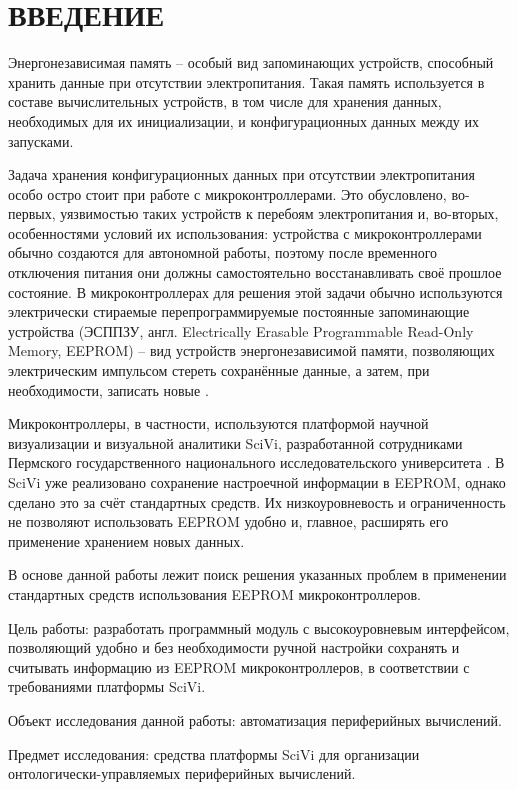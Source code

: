 \chapter*{ВВЕДЕНИЕ}

Энергонезависимая память -- особый вид запоминающих устройств, способный хранить данные при отсутствии электропитания.
Такая память используется в составе вычислительных устройств, в том числе для хранения данных, необходимых для их инициализации, и конфигурационных данных между их запусками.

Задача хранения конфигурационных данных при отсутствии электропитания особо остро стоит при работе с микроконтроллерами.
Это обусловлено, во-первых, уязвимостью таких устройств к перебоям электропитания и, во-вторых, особенностями условий их использования: устройства с микроконтроллерами обычно создаются для автономной работы, поэтому после временного отключения питания они должны самостоятельно восстанавливать своё прошлое состояние.
В микроконтроллерах для решения этой задачи обычно используются электрически стираемые перепрограммируемые постоянные запоминающие устройства (ЭСППЗУ, англ. Electrically Erasable Programmable Read-Only Memory, EEPROM) -- вид устройств энергонезависимой памяти, позволяющих электрическим импульсом стереть сохранённые данные, а затем, при необходимости, записать новые \cite{incollection:eeprom-proposal, article:eeprom}.

Микроконтроллеры, в частности, используются платформой научной визуализации и визуальной аналитики SciVi, разработанной сотрудниками Пермского государственного национального исследовательского университета \cite{article:scivi, article:scivi-overview}.
В SciVi уже реализовано сохранение настроечной информации в EEPROM, однако сделано это за счёт стандартных средств. Их низкоуровневость и ограниченность не позволяют использовать EEPROM удобно и, главное, расширять его применение хранением новых данных.

В основе данной работы лежит поиск решения указанных проблем в применении стандартных средств использования EEPROM микроконтроллеров.

Цель работы: разработать программный модуль с высокоуровневым интерфейсом, позволяющий удобно и без необходимости ручной настройки сохранять и считывать информацию из EEPROM микроконтроллеров, в соответствии с требованиями платформы SciVi.

Объект исследования данной работы: автоматизация периферийных вычислений.

Предмет исследования: средства платформы SciVi для организации онтологически-управляемых периферийных вычислений.

